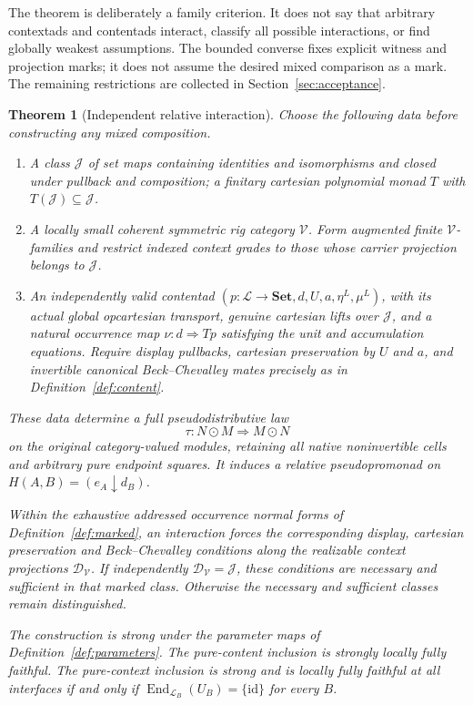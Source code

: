 \documentclass[11pt,a4paper]{article}
\newtheorem{theorem}{Theorem}[section]
\theoremstyle{definition}
\newcommand{\Set}{\mathbf{Set}}
\newcommand{\V}{\mathcal V}
\newcommand{\Lcat}{\mathcal L}
\newcommand{\J}{\mathcal J}
\newcommand{\D}{\mathcal D_{\V}}
\newcommand{\id}{\mathrm{id}}
\newcommand{\End}{\operatorname{End}}
\begin{document}
The theorem is deliberately a family criterion. It does not say that arbitrary
contextads and contentads interact, classify all possible interactions, or find
globally weakest assumptions. The bounded converse fixes explicit witness and
projection marks; it does not assume the desired mixed comparison as a mark.
The remaining restrictions are collected in Section~\ref{sec:acceptance}.

\begin{theorem}[Independent relative interaction]\label{thm:main}
Choose the following data before constructing any mixed composition.
\begin{enumerate}[label=\textup{(\roman*)}]
\item A class $\J$ of set maps containing identities and isomorphisms and
closed under pullback and composition; a finitary cartesian polynomial monad
$T$ with $T(\J)\subseteq\J$.
\item A locally small coherent symmetric rig category $\V$. Form augmented
finite $\V$-families and restrict indexed context grades to those whose carrier
projection belongs to $\J$.
\item An independently valid contentad $(p:\Lcat\to\Set,d,U,a,\eta^L,\mu^L)$,
with its actual global opcartesian transport, genuine cartesian lifts over
$\J$, and a natural occurrence map $\nu:d\Rightarrow Tp$ satisfying the unit and
accumulation equations. Require display pullbacks, cartesian preservation by
$U$ and $a$, and invertible canonical Beck--Chevalley mates precisely as in
Definition~\ref{def:content}.
\end{enumerate}
These data determine a full pseudodistributive law
\[
 \tau:N\odot M\Longrightarrow M\odot N
\]
on the original category-valued modules, retaining all native noninvertible
cells and arbitrary pure endpoint squares. It induces a relative
pseudopromonad on $H(A,B)=(e_A\downarrow d_B)$.

Within the exhaustive addressed occurrence normal forms of
Definition~\ref{def:marked}, an interaction forces the corresponding display,
cartesian preservation and Beck--Chevalley conditions along the realizable
context projections $\D$. If independently $\D=\J$, these conditions are
necessary and sufficient in that marked class. Otherwise the necessary and
sufficient classes remain distinguished.

The construction is strong under the parameter maps of
Definition~\ref{def:parameters}. The pure-content inclusion is strongly
locally fully faithful. The pure-context inclusion is strong and is locally
fully faithful at all interfaces if and only if
$\End_{\Lcat_B}(U_B)=\{\id\}$ for every $B$.
\end{theorem}
\end{document}
